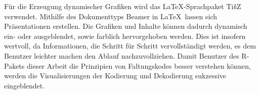 Für die Erzeugung dynamischer Grafiken wird das \LaTeX -Sprachpaket Ti\textit{k}Z verwendet. Mithilfe des Dokumenttyps Beamer in \LaTeX\ lassen sich Präsentationen erstellen. Die Grafiken und Inhalte können dadurch dynamisch ein- oder ausgeblendet, sowie farblich hervorgehoben werden. Dies ist insofern wertvoll, da Informationen, die Schritt für Schritt vervollständigt werden, es dem Benutzer leichter machen den Ablauf nachzuvollziehen. Damit Benutzer des R-Pakets dieser Arbeit die Prinzipien von Faltungskodes besser verstehen können, werden die Visualisierungen der Kodierung und Dekodierung sukzessive eingeblendet.